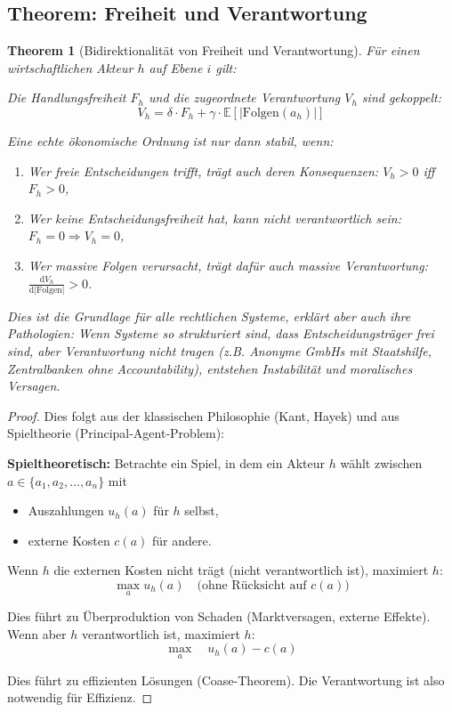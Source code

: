 \documentclass[a4paper, 12pt, twoside, openright]{report}
\newtheorem{theorem}{Theorem}[section]
\theoremstyle{definition}
\theoremstyle{definition}
\begin{document}
\subsection{Theorem: Freiheit und Verantwortung}

\begin{theorem}[Bidirektionalität von Freiheit und Verantwortung]
\label{thm:freiheit-verantwortung}
Für einen wirtschaftlichen Akteur $h$ auf Ebene $i$ gilt:

Die Handlungsfreiheit $F_h$ und die zugeordnete Verantwortung $V_h$ sind gekoppelt:
\begin{equation}
V_h = \delta \cdot F_h + \gamma \cdot \mathbb{E}[|\text{Folgen}(a_h)|]
\end{equation}

Eine echte ökonomische Ordnung ist nur dann stabil, wenn:
\begin{enumerate}
\item Wer freie Entscheidungen trifft, trägt auch deren Konsequenzen: $V_h > 0$ iff $F_h > 0$,
\item Wer keine Entscheidungsfreiheit hat, kann nicht verantwortlich sein: $F_h = 0 \Rightarrow V_h = 0$,
\item Wer massive Folgen verursacht, trägt dafür auch massive Verantwortung: $\frac{\mathrm{d}V_h}{\mathrm{d}|\text{Folgen}|} > 0$.
\end{enumerate}

Dies ist die Grundlage für alle rechtlichen Systeme, erklärt aber auch ihre Pathologien: Wenn Systeme so strukturiert sind, dass Entscheidungsträger frei sind, aber Verantwortung nicht tragen (z.B. Anonyme GmbHs mit Staatshilfe, Zentralbanken ohne Accountability), entstehen Instabilität und moralisches Versagen.
\end{theorem}

\begin{proof}
Dies folgt aus der klassischen Philosophie (Kant, Hayek) und aus Spieltheorie (Principal-Agent-Problem):

\textbf{Spieltheoretisch:} Betrachte ein Spiel, in dem ein Akteur $h$ wählt zwischen $a \in \{a_1, a_2, \ldots, a_n\}$ mit
\begin{itemize}
\item Auszahlungen $u_h(a)$ für $h$ selbst,
\item externe Kosten $c(a)$ für andere.
\end{itemize}

Wenn $h$ die externen Kosten nicht trägt (nicht verantwortlich ist), maximiert $h$:
\begin{equation}
\max_a u_h(a) \quad \text{(ohne Rücksicht auf $c(a)$)}
\end{equation}

Dies führt zu Überproduktion von Schaden (Marktversagen, externe Effekte). Wenn aber $h$ verantwortlich ist, maximiert $h$:
\begin{equation}
\max_a \quad u_h(a) - c(a)
\end{equation}

Dies führt zu effizienten Lösungen (Coase-Theorem). Die Verantwortung ist also notwendig für Effizienz.
\end{proof}
\end{document}
